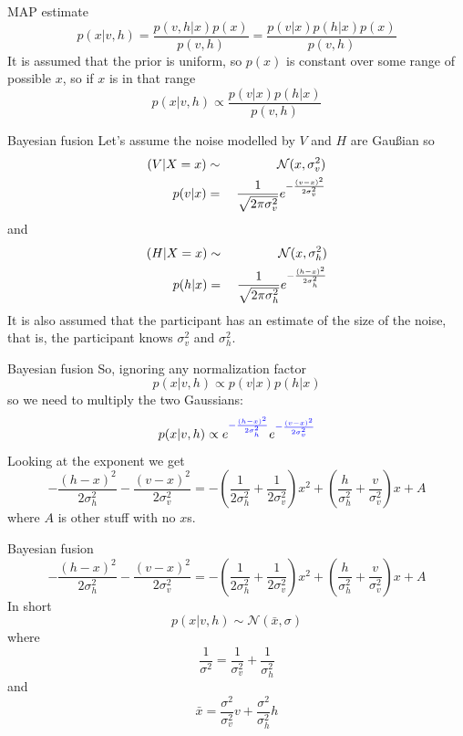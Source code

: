 \documentclass{beamer}
\newcommand{\crish}{\color{reddish}}
\newcommand{\cbla}{\color{black}}
\newcommand{\cred}{\color{red}}
\newcommand{\cblu}{\color{blue}}
\begin{document}
\begin{frame}{MAP estimate}
  \crish$$
p(x|v,h)=\frac{p(v,h|x)p(x)}{p(v,h)}=\frac{p(v|x)p(h|x)p(x)}{p(v,h)}
$$\cbla{}
It is assumed that the prior is uniform, so \crish$p(x)$\cbla{} is constant over some range of possible \crish$x$\cbla{}, so if \crish$x$\cbla{} is in that range
\crish$$
p(x|v,h)\propto \frac{p(v|x)p(h|x)}{p(v,h)}
$$\cbla{}
\end{frame}

\begin{frame}{Bayesian fusion}
  Let's assume the noise modelled by \cblu$V$\cbla{} and \cred$H$\cbla{} are Gau\ss{}ian so
\cblu
  \begin{eqnarray*}
    (V|X=x)&\sim{}&\mathcal{N}(x,\sigma_v^2)\cr
    p(v|x)&=&\frac{1}{\sqrt{2\pi\sigma_v^2}}e^{-\frac{(v-x)^2}{2\sigma_v^2}}
  \end{eqnarray*}
  \cbla{}
  and
    \cred
  \begin{eqnarray*}
    (H|X=x)&\sim{}&\mathcal{N}(x,\sigma_h^2)\cr
    p(h|x)&=&\frac{1}{\sqrt{2\pi\sigma_h^2}}e^{-\frac{(h-x)^2}{2\sigma_h^2}}
  \end{eqnarray*}
  \cbla{}
  It is also assumed that the participant has an estimate of the size of the noise, that is, the participant knows \cblu$\sigma_v^2$\cbla{} and \cred$\sigma_h^2$\cbla{}.
\end{frame}
  

\begin{frame}{Bayesian fusion}
So, ignoring any normalization factor
  \crish$$
  p(x|v,h)\propto p(v|x)p(h|x)
  $$\cbla{}
  so we need to multiply the two Gaussians:
  \crish$$
  p(x|v,h)\propto e^{\cblu-\frac{(h-x)^2}{2\sigma_h^2}\cbla}e^{\cblu-\frac{(v-x)^2}{2\sigma_v^2}\cbla}
  $$\cbla{}
  Looking at the exponent we get
\cblu$$
-\frac{(h-x)^2}{2\sigma_h^2}-\frac{(v-x)^2}{2\sigma_v^2}=-\left(\frac{1}{2\sigma_h^2}+\frac{1}{2\sigma_v^2}\right)x^2+\left(\frac{h}{\sigma_h^2}+\frac{v}{\sigma_v^2}\right)x+A
    $$\cbla{}
  where \cblu$A$\cbla{} is other stuff with no \cblu$x$\cbla{}s.
  \end{frame}


\begin{frame}{Bayesian fusion}
\crish$$
-\frac{(h-x)^2}{2\sigma_h^2}-\frac{(v-x)^2}{2\sigma_v^2}=-\left(\frac{1}{2\sigma_h^2}+\frac{1}{2\sigma_v^2}\right)x^2+\left(\frac{h}{\sigma_h^2}+\frac{v}{\sigma_v^2}\right)x+A
    $$\cbla{}
In short
\crish$$
p(x|v,h)\sim \mathcal{N}(\bar{x},\sigma)
$$\cbla{}
where
\crish$$
\frac{1}{\sigma^2}=\frac{1}{\sigma_v^2}+\frac{1}{\sigma_h^2}
$$\cbla{}
and
\crish$$
\bar{x}=\frac{\sigma^2}{\sigma_v^2}v+\frac{\sigma^2}{\sigma_h^2}h
$$\cbla{}
\end{frame}
\end{document}
